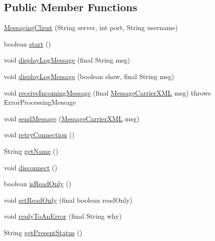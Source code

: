 \subsection*{Public Member Functions}
\begin{DoxyCompactItemize}
\item 
\hyperlink{classgov_1_1fnal_1_1ppd_1_1dd_1_1chat_1_1MessagingClient_ae80bb10f995ac1e56519651d6e7bbc3a}{Messaging\-Client} (String server, int port, String username)
\item 
boolean \hyperlink{classgov_1_1fnal_1_1ppd_1_1dd_1_1chat_1_1MessagingClient_a68a15cf975653221f512387755cf392e}{start} ()
\item 
void \hyperlink{classgov_1_1fnal_1_1ppd_1_1dd_1_1chat_1_1MessagingClient_a13f893f839b69ca54b3ff1e7d8e890d7}{display\-Log\-Message} (final String msg)
\item 
void \hyperlink{classgov_1_1fnal_1_1ppd_1_1dd_1_1chat_1_1MessagingClient_afa39b6278a4a60bf1b272e1a70317dfb}{display\-Log\-Message} (boolean show, final String msg)
\item 
void \hyperlink{classgov_1_1fnal_1_1ppd_1_1dd_1_1chat_1_1MessagingClient_a0fea6f95402827dbbd88ebc22d357d8b}{receive\-Incoming\-Message} (final \hyperlink{classgov_1_1fnal_1_1ppd_1_1dd_1_1xml_1_1MessageCarrierXML}{Message\-Carrier\-X\-M\-L} msg)  throws Error\-Processing\-Message 
\item 
void \hyperlink{classgov_1_1fnal_1_1ppd_1_1dd_1_1chat_1_1MessagingClient_a40df82f525cdeda6046be90c2f80f095}{send\-Message} (\hyperlink{classgov_1_1fnal_1_1ppd_1_1dd_1_1xml_1_1MessageCarrierXML}{Message\-Carrier\-X\-M\-L} msg)
\item 
void \hyperlink{classgov_1_1fnal_1_1ppd_1_1dd_1_1chat_1_1MessagingClient_a1db3a15685ceaa8514f041edb3dea297}{retry\-Connection} ()
\item 
String \hyperlink{classgov_1_1fnal_1_1ppd_1_1dd_1_1chat_1_1MessagingClient_afe1ec3b4d646cebe99db9579a6682643}{get\-Name} ()
\item 
void \hyperlink{classgov_1_1fnal_1_1ppd_1_1dd_1_1chat_1_1MessagingClient_ab28012456765215ffdf3b9beb3f3ef00}{disconnect} ()
\item 
boolean \hyperlink{classgov_1_1fnal_1_1ppd_1_1dd_1_1chat_1_1MessagingClient_a0f0d1ad1f8dcf7eec17aea757a892f36}{is\-Read\-Only} ()
\item 
void \hyperlink{classgov_1_1fnal_1_1ppd_1_1dd_1_1chat_1_1MessagingClient_a17056456457c874463b76d4bd0c7c167}{set\-Read\-Only} (final boolean read\-Only)
\item 
void \hyperlink{classgov_1_1fnal_1_1ppd_1_1dd_1_1chat_1_1MessagingClient_afcf0a1f43fdbdee733d51f75ad9845f9}{reply\-To\-An\-Error} (final String why)
\item 
String \hyperlink{classgov_1_1fnal_1_1ppd_1_1dd_1_1chat_1_1MessagingClient_a774e53e588366cf5ab9ec1497e355844}{get\-Present\-Status} ()
\end{DoxyCompactItemize}
